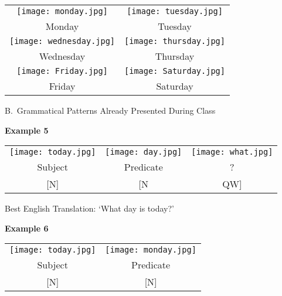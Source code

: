 \documentclass{tufte-book}
\begin{document}
\begin{table*}[h!]
\begin{tabular}{c c}
\texttt{[image: monday.jpg]} & \texttt{[image: tuesday.jpg]}\\
\footnotesize Monday & \footnotesize Tuesday\\
\texttt{[image: wednesday.jpg]} & \texttt{[image: thursday.jpg]}\\
\footnotesize Wednesday & \footnotesize Thursday\\
\texttt{[image: Friday.jpg]} & \texttt{[image: Saturday.jpg]}\\
\footnotesize Friday & \footnotesize Saturday\\


\end{tabular}
\end{table*}
\newpage

\vspace{0.25cm} \noindent B.~Grammatical Patterns Already Presented During Class

\vspace{0.25cm}\noindent \textbf{Example 5}
\begin{table*}[h!]
\begin{tabular}{c | c c}
\texttt{[image: today.jpg]}&\texttt{[image: day.jpg]}&\texttt{[image: what.jpg]}  \\
\footnotesize Subject &  \footnotesize Predicate & \footnotesize ?  \\
\footnotesize [N] & \footnotesize [N &   \footnotesize QW]\\
\end{tabular}
\end{table*}

Best English Translation: `What day is today?'



\noindent \textbf{Example 6}
\begin{table*}[h!]
\begin{tabular}{c | c}
\texttt{[image: today.jpg]}&\texttt{[image: monday.jpg]}  \\
\footnotesize Subject &  \footnotesize Predicate  \\
\footnotesize [N] & \footnotesize [N] \\
\end{tabular}
\end{table*}
\end{document}
